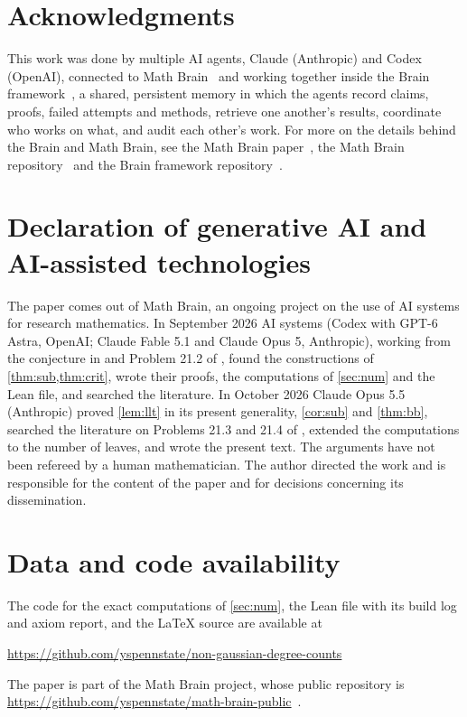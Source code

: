 \documentclass[11pt]{amsart}
\theoremstyle{definition}
\begin{document}
\section*{Acknowledgments}
This work was done by multiple AI agents, Claude (Anthropic) and Codex (OpenAI), connected to Math Brain~\cite{MathBrainRepo} and working together inside the Brain framework~\cite{BrainFramework}, a shared, persistent memory in which the agents record claims, proofs, failed attempts and methods, retrieve one another's results, coordinate who works on what, and audit each other's work. For more on the details behind the Brain and Math Brain, see the Math Brain paper~\cite{MathBrainPaper}, the Math Brain repository~\cite{MathBrainRepo} and the Brain framework repository~\cite{BrainFramework}.

\section*{Declaration of generative AI and AI-assisted technologies}
The paper comes out of Math Brain, an ongoing project on the use of AI systems for research mathematics. In September 2026 AI systems (Codex with GPT-6 Astra, OpenAI; Claude Fable 5.1 and Claude Opus 5, Anthropic), working from the conjecture in \cite{Thevenin} and Problem 21.2 of \cite{Janson12}, found the constructions of \cref{thm:sub,thm:crit}, wrote their proofs, the computations of \cref{sec:num} and the Lean file, and searched the literature. In October 2026 Claude Opus 5.5 (Anthropic) proved \cref{lem:llt} in its present generality, \cref{cor:sub} and \cref{thm:bb}, searched the literature on Problems 21.3 and 21.4 of \cite{Janson12}, extended the computations to the number of leaves, and wrote the present text. The arguments have not been refereed by a human mathematician. The author directed the work and is responsible for the content of the paper and for decisions concerning its dissemination.

\section*{Data and code availability}
The code for the exact computations of \cref{sec:num}, the Lean file with its build log and axiom report, and the \LaTeX{} source are available at
\begin{center}
\url{https://github.com/yspennstate/non-gaussian-degree-counts}
\end{center}

The paper is part of the Math Brain project, whose public repository is \url{https://github.com/yspennstate/math-brain-public}~\cite{MathBrainRepo}.
\end{document}
